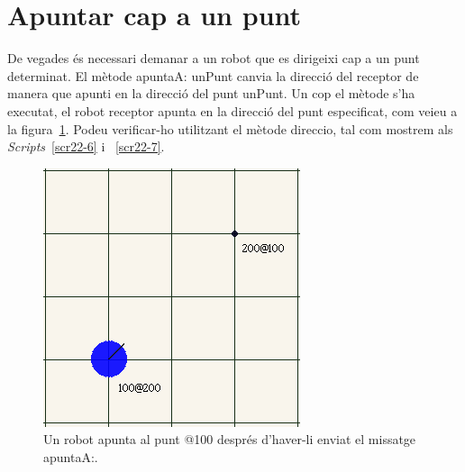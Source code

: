 \section{Apuntar cap a un punt}
De vegades és necessari demanar a un robot que es dirigeixi cap a un punt determinat. El mètode \textsf{apuntaA: unPunt} canvia la direcció del receptor de manera que apunti en la direcció del punt \textsf{unPunt}. Un cop el mètode s'ha executat, el robot receptor apunta en la direcció del punt especificat, com veieu a la figura~\ref{fig2202}. Podeu verificar-ho utilitzant el mètode \textsf{direccio}, tal com mostrem als \emph{Scripts}~\ref{scr22-6} i ~\ref{scr22-7}.
\begin{figure}[h!]
\begin{center}
\includegraphics[scale=0.5]{Imatges/figura22-2}
\end{center}
\caption{Un robot apunta al punt \textsf{@100} després d'haver-li enviat el missatge \textsf{\upshape apuntaA:}.}
\label{fig2202}
\end{figure}


